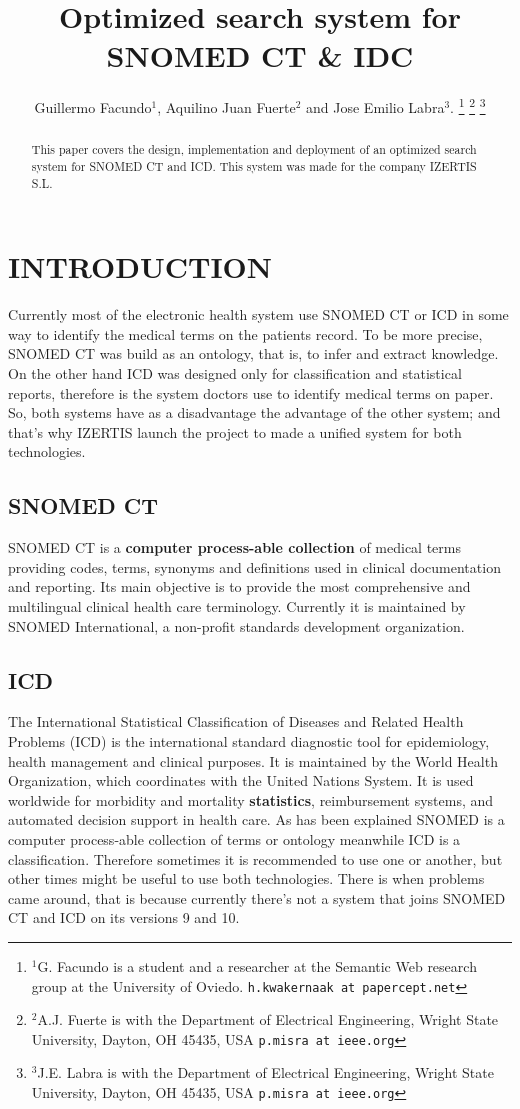 \documentclass[letterpaper, 10 pt, conference]{ieeeconf}  %
\title{\LARGE \bf
Optimized search system for SNOMED CT \& IDC
}
\author{Guillermo Facundo$^{1}$, Aquilino Juan Fuerte$^{2}$ and Jose Emilio Labra$^{3}.$%
\thanks{$^{1}$G. Facundo is a student and a researcher at the Semantic Web research group at the University of Oviedo.
        {\tt\small h.kwakernaak at papercept.net}}%
\thanks{$^{2}$A.J. Fuerte is with the Department of Electrical Engineering, Wright State University,
        Dayton, OH 45435, USA
        {\tt\small p.misra at ieee.org}}%
\thanks{$^{3}$J.E. Labra is with the Department of Electrical Engineering, Wright State University,
        Dayton, OH 45435, USA
        {\tt\small p.misra at ieee.org}}%
}
\begin{document}
\maketitle
\thispagestyle{empty}
\pagestyle{empty}


\begin{abstract}

This paper covers the design, implementation and deployment of an optimized search system for SNOMED CT and ICD. This system was made for the company IZERTIS S.L.

\end{abstract}


\section{INTRODUCTION}

Currently most of the electronic health system use SNOMED CT or ICD in some way to identify the medical terms on the patients record. To be more precise, SNOMED CT was build as an ontology, that is, to infer and extract knowledge. On the other hand ICD was designed only for classification and statistical reports, therefore is the system doctors use to identify medical terms on paper. So, both systems have as a disadvantage the advantage of the other system; and that's why IZERTIS launch the project to made a unified system for both technologies. 

\subsection{SNOMED CT}

SNOMED CT is a \textbf{computer process-able collection} of medical terms providing codes, terms, synonyms and definitions used in clinical documentation and reporting. Its main objective is to provide the most comprehensive and multilingual clinical health care terminology. Currently it is maintained by SNOMED International, a non-profit standards development organization.

\subsection{ICD}

The International Statistical Classification of Diseases and Related Health Problems (ICD) is the international standard diagnostic tool for epidemiology, health management and clinical purposes. It is maintained by the World Health Organization, which coordinates with the United Nations System. It is used worldwide for morbidity and mortality \textbf{statistics}, reimbursement systems, and automated decision support in health care. 
As has been explained SNOMED is a computer process-able collection of terms or ontology meanwhile ICD is a classification. Therefore sometimes it is recommended to use one or another, but other times might be useful to use both technologies. There is when problems came around, that is because currently there’s not a system that joins SNOMED CT and ICD on its versions 9 and 10.
\end{document}
